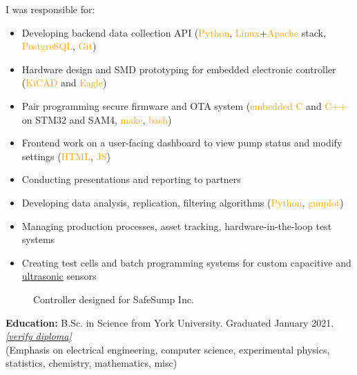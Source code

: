 \documentclass[fleqn,11pt]{article}
\newcommand{\sk}[1]{\textcolor{orange}{#1}}
\newcommand{\itemoptions}{\setlength{\itemindent}{-10pt} \setlength\itemsep{-1em}}
\begin{document}
I was responsible for:
\begin{itemize}\itemoptions
\item Developing backend data collection API (\sk{Python}, \sk{Linux}+\sk{Apache} stack, \sk{PostgreSQL}, \sk{Git}) %
\item Hardware design and SMD prototyping for embedded electronic controller (\sk{KiCAD} and \sk{Eagle})
\item Pair programming secure firmware and OTA system (\sk{embedded C} and \sk{C++} on STM32 and SAM4, \sk{make}, \sk{bash})
\item Frontend work on a user-facing dashboard to view pump status and modify settings (\sk{HTML}, \sk{JS})
\item Conducting presentations and reporting to partners
\item Developing data analysis, replication, filtering algorithms (\sk{Python}, \sk{gnuplot})
\item Managing production processes, asset tracking, hardware-in-the-loop test systems
\item Creating test cells and batch programming systems for custom capacitive and \href{https://github.com/0xDBFB7/UltimateUltrasonicAmplifier}{ultrasonic} sensors
\end{itemize}


\begin{figure}[H]
	\centering
	\captionsetup{labelformat=empty}
	
	\caption*{Controller designed for SafeSump Inc.}
	\hfill
\end{figure}


\begin{tcolorbox}
	\textbf{Education:} B.Sc. in Science from York University. Graduated January 2021. \href{https://learner.mycreds.ca/#/sharelink/b664abe7-53a7-4d64-a0f1-bef16337edd0/57724eeb-34ab-4b79-b2a6-cd6bc311039e}{\textit{[verify diploma]}} \\
	{\small(Emphasis on electrical engineering, computer science, experimental physics, statistics, chemistry, mathematics, misc)}
\end{tcolorbox}
 
\pagebreak
\end{document}
